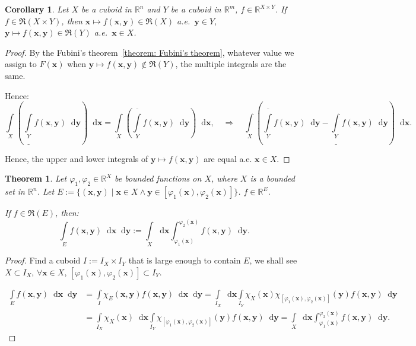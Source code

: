 \documentclass[openany]{book}
\theoremstyle{plain}
\newtheorem{theorem}{Theorem}[section] %
\newtheorem{corollary}{Corollary} %
\theoremstyle{definition}
\newcommand{\dif}{\mathop{}\!\mathrm{d}} %
\newcommand*{\bv}{\boldsymbol} %
\begin{document}
\begin{corollary}
	Let $X$ be a cuboid in $\mathbb R^n$ and $Y$ be a cuboid in $\mathbb R^m$, $f \in \mathbb R^{X \times Y}$. 
	If $f \in \mathfrak R(X \times Y)$, then $\bv x \mapsto f(\bv x, \bv y) \in \mathfrak R(X)$ a.e.\ $\bv y \in Y$, $\bv y \mapsto f(\bv x, \bv y) \in \mathfrak R(Y)$ a.e.\ $\bv x \in X$.
\end{corollary}
\begin{proof}
	By the Fubini's theorem~\ref{theorem: Fubini's theorem}, whatever value we assign to $F(\bv x)$ when $\bv y \mapsto f(\bv x, \bv y) \notin \mathfrak R(Y)$, the multiple integrals are the same.

	Hence:
	\begin{equation*}
		\int\limits_X \left(
			\underline{\int\limits_Y} f(\bv x, \bv y) \dif \bv y 
		\right) \dif \bv x
		= \int\limits_X \left(
			\overline{\int\limits_Y} f(\bv x, \bv y) \dif \bv y 
		\right) \dif \bv x,
		\quad\Rightarrow\quad
		\int\limits_X \left(
			\overline{\int\limits_Y} f(\bv x, \bv y) \dif \bv y
			- \underline{\int\limits_Y} f(\bv x, \bv y) \dif \bv y 
		\right) \dif \bv x.
	\end{equation*}

	Hence, the upper and lower integrals of $\bv y \mapsto f(\bv x, \bv y)$ are equal a.e. $\bv x \in X$.
\end{proof}

\begin{theorem}
	Let $\varphi_1, \varphi_2 \in \mathbb R^X$ be bounded functions on $X$, where $X$ is a bounded set in $\mathbb R^n$. 
	Let $E := \{ (\bv x, \bv y) \mid \bv x \in X \wedge \bv y \in [\varphi_1(\bv x), \varphi_2(\bv x)] \}$.
	$f \in \mathbb R^E$.

	If $f \in \mathfrak R(E)$, then:
	\begin{equation*}
		\int\limits_E f(\bv x, \bv y) \dif \bv x \dif \bv y 
			:= \int\limits_X \dif \bv x \int^{\varphi_2(\bv x)}_{\varphi_1(\bv x)} f(\bv x, \bv y) \dif \bv y.
	\end{equation*}
\end{theorem}
\begin{proof}
	Find a cuboid $I := I_X \times I_Y$ that is large enough to contain $E$, we shall see $X \subset I_X$, $\forall \bv x \in X$, $[\varphi_1(\bv x), \varphi_2(\bv x)] \subset I_Y$. 

	\begin{align*}
		\int\limits_E f(\bv x, \bv y) \dif \bv x \dif \bv y
		&= \int\limits_I \chi_E(\bv x, \bv y) f(\bv x, \bv y) \dif \bv x \dif \bv y
		= \int\limits_{I_X} \dif \bv x \int\limits_{I_Y} \chi_X (\bv x) \chi_{[\varphi_1(\bv x), \varphi_2(\bv x)]} (\bv y) f(\bv x, \bv y)  \dif \bv y
		\\
		&= \int\limits_{I_X} \chi_X (\bv x) \dif \bv x 
			\int\limits_{I_Y}  \chi_{[\varphi_1(\bv x), \varphi_2(\bv x)]} (\bv y) f(\bv x, \bv y)  \dif \bv y
		= \int\limits_X \dif \bv x \int^{\varphi_2(\bv x)}_{\varphi_1(\bv x)} f(\bv x, \bv y) \dif \bv y.
	\end{align*}
\end{proof}
\end{document}
